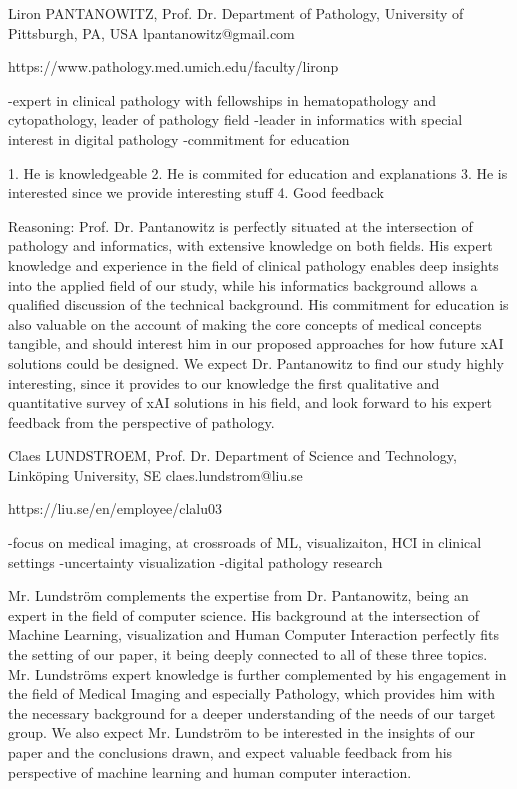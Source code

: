 Liron PANTANOWITZ, Prof. Dr. Department of Pathology, University of
Pittsburgh, PA, USA
lpantanowitz@gmail.com

https://www.pathology.med.umich.edu/faculty/lironp

-expert in clinical pathology with fellowships in hematopathology and cytopathology, leader of pathology field
-leader in informatics with special interest in digital pathology
-commitment for education

1. He is knowledgeable
2. He is commited for education and explanations
3. He is interested since we provide interesting stuff
4. Good feedback

Reasoning:
Prof. Dr. Pantanowitz is perfectly situated at the intersection of pathology and informatics, with extensive knowledge on both fields. His expert knowledge and experience in the field of clinical pathology enables deep insights into the applied field of our study, while his informatics background allows a qualified discussion of the technical background. His commitment for education is also valuable on the account of making the core concepts of medical concepts tangible, and should interest him in our proposed approaches for how future xAI solutions could be designed. We expect Dr. Pantanowitz to find our study highly interesting, since it provides to our knowledge the first qualitative and quantitative survey of xAI solutions in his field, and look forward to his expert feedback from the perspective of pathology.

Claes LUNDSTROEM, Prof. Dr. Department of Science and Technology,
Linköping University, SE
claes.lundstrom@liu.se

https://liu.se/en/employee/clalu03

-focus on medical imaging, at crossroads of ML, visualizaiton, HCI in clinical settings
-uncertainty visualization
-digital pathology research

Mr. Lundström complements the expertise from Dr. Pantanowitz, being an expert in the field of computer science. His background at the intersection of Machine Learning, visualization and Human Computer Interaction perfectly fits the setting of our paper, it being deeply connected to all of these three topics. Mr. Lundströms expert knowledge is further complemented by his engagement in the field of Medical Imaging and especially Pathology, which provides him with the necessary background for a deeper understanding of the needs of our target group. We also expect Mr. Lundström to be interested in the insights of our paper and the conclusions drawn, and expect valuable feedback from his perspective of machine learning and human computer interaction.